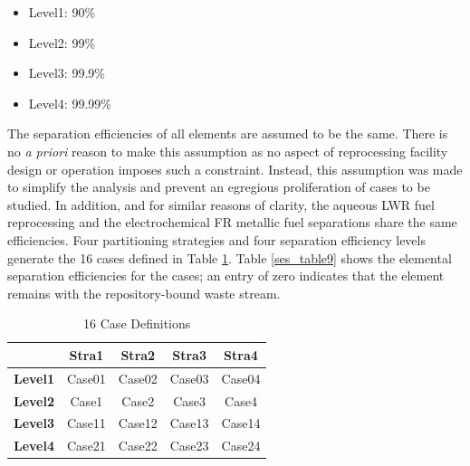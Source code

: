 \begin{itemize}
    \item Level1: 90\%
    \item Level2: 99\% 
    \item Level3: 99.9\%
    \item Level4: 99.99\%
\end{itemize}

The separation efficiencies of all elements are assumed to be the same.
There is no \emph{a priori} reason to make this assumption as no aspect of
reprocessing facility design or operation imposes such a constraint. 
Instead, this assumption was made to simplify the analysis and prevent
an egregious proliferation of cases to be studied.  In addition, and for
similar reasons of clarity, the aqueous LWR fuel reprocessing and the
electrochemical FR metallic fuel separations share the same
efficiencies. Four partitioning strategies and four separation
efficiency levels generate the 16 cases defined in Table \ref{ses_table8}.  
Table \ref{ses_table9} shows the elemental separation efficiencies for the cases; an entry of
zero indicates that the element remains with the repository-bound waste
stream.

\begin{table}[htbp]
\begin{center}
\caption{16 Case Definitions}
\label{ses_table8}
\begin{tabular}{|l|c|c|c|c|}
\hline
                & \textbf{Stra1} & \textbf{Stra2} & \textbf{Stra3} & \textbf{Stra4} \\
\hline
\textbf{Level1} & Case01         & Case02         & Case03         & Case04 \\
\textbf{Level2} & Case1          & Case2          & Case3          & Case4 \\
\textbf{Level3} & Case11         & Case12         & Case13         & Case14 \\
\textbf{Level4} & Case21         & Case22         & Case23         & Case24 \\
\hline
\end{tabular}
\end{center}
\end{table}

